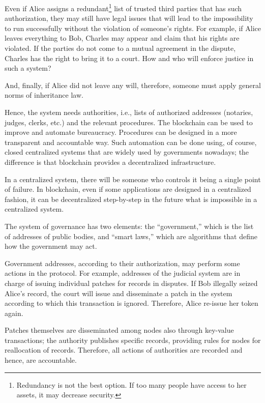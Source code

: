 \begin{multicols}{2}
\vspace{-.1cm}

Even if Alice assigns a redundant\footnote{Redundancy is not the best option. If too many people have access to her assets, it may decrease security.} list of trusted third parties that has such authorization, they may still have legal issues that will lead to the impossibility to run successfully without the violation of someone's rights. For example, if Alice leaves everything to Bob, Charles may appear and claim that his rights are violated. If the parties do not come to a mutual agreement in the dispute, Charles has the right to bring it to a court. How and who will enforce justice in such a system?

\vspace{-.1cm}

And, finally, if Alice did not leave any will, therefore, someone must apply general norms of inheritance law.

Hence, the system needs authorities, i.e., lists of authorized addresses (notaries, judges, clerks, etc.) and the relevant procedures. The blockchain can be used to improve and automate bureaucracy. Procedures can be designed in a more transparent and accountable way. Such automation can be done using, of course, closed centralized systems that are widely used by governments nowadays; the difference is that blockchain provides a decentralized infrastructure.

In a centralized system, there will be someone who controls it being a single point of failure. In blockchain, even if some applications are designed in a centralized fashion, it can be decentralized step-by-step in the future what is impossible in a centralized system.

The system of governance has two elements: the “government,” which is the list of addresses of public bodies, and “smart laws,” which are algorithms that define how the government may act.

Government addresses, according to their authorization, may perform some actions in the protocol. For example, addresses of the judicial system are in charge of issuing individual patches for records in disputes. If Bob illegally seized Alice’s record, the court will issue and disseminate a patch in the system according to which this transaction is ignored. Therefore, Alice re-issue her token again.

Patches themselves are disseminated among nodes also through key-value transactions; the authority publishes specific records, providing rules for nodes for reallocation of records. Therefore, all actions of authorities are recorded and hence, are accountable.


\end{multicols}

